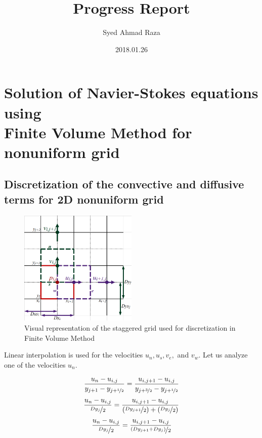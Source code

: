 \documentclass[12pt,a4paper,fleqn]{article}
\title{Progress Report}
\author{Syed Ahmad Raza}
\date{2018.01.26}
\begin{document}
\maketitle
\pagebreak

\section{Solution of Navier-Stokes equations using\\
    Finite Volume Method for nonuniform grid}

\subsection{Discretization of the convective and diffusive terms for 2D nonuniform grid}

\begin{figure}[H]
    \centering
    \includegraphics[width=0.5\textwidth]{staggered_grid.png}
    \caption{Visual representation of the staggered grid used for discretization in Finite Volume Method}
    \label{fig:staggered-grid}
\end{figure}

Linear interpolation is used for the velocities \(u_n, u_s, v_e,\) and \(v_w\). Let us analyze one of the velocities \(u_n\).

\begin{equation*}
\frac{u_n - u_{i,j}}{y_{j+1} - y_{j+\nicefrac{1}{2}}}
= \frac{u_{i,j+1} - u_{i,j}}{y_{j+\nicefrac{3}{2}} - y_{j+\nicefrac{1}{2}}}
\end{equation*}
\begin{equation*}
\frac{u_n - u_{i,j}}{\nicefrac{Dy_j}{2}}
= \frac{u_{i,j+1} - u_{i,j}}
{\left(\nicefrac{Dy_{j+1}}{2}\right) + \left(\nicefrac{Dy_j}{2}\right)}
\end{equation*}
\begin{equation*}
\frac{u_n - u_{i,j}}{\nicefrac{Dy_j}{2}}
= \frac{u_{i,j+1} - u_{i,j}}
{\nicefrac{\left(Dy_{j+1} +Dy_j\right)}{2}}
\end{equation*}
\end{document}

